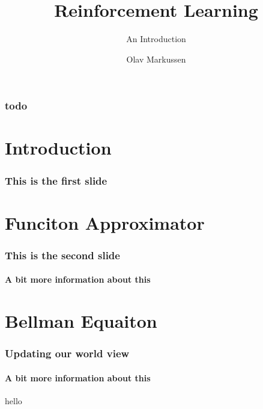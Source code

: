 \documentclass{beamer}
\begin{document}
\title{Reinforcement Learning}
\subtitle{An Introduction}
\author{Olav Markussen}
\frame{\titlepage}

\begin{frame}
  \frametitle{todo}
  \tableofcontents[currentsection]
\end{frame}

\section{Introduction}


\begin{frame}
  \frametitle{This is the first slide}
\end{frame}



\section{Funciton Approximator}


\begin{frame}
  \frametitle{This is the second slide}
  \framesubtitle{A bit more information about this}
\end{frame}

\section{Bellman Equaiton}
\begin{frame}
  \frametitle{Updating our world view}
  \framesubtitle{A bit more information about this}
  \begin{block}{hello}
    \inputminted[firstline=21, lastline=22, autogobble,breaklines]{python}{../updates.py}
  \end{block}
\end{frame}
\end{document}
